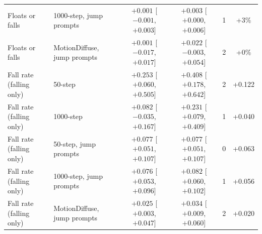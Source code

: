 \begin{tabular}{llcccc}
Floats or falls & 1000-step, jump prompts & $+0.001$ [$-0.001$, $+0.003$] & $+0.003$ [$+0.000$, $+0.006$] & 1 & +3\% \\
Floats or falls & MotionDiffuse, jump prompts & $+0.001$ [$-0.017$, $+0.017$] & $+0.022$ [$-0.003$, $+0.054$] & 2 & +0\% \\
\addlinespace[2pt]
Fall rate (falling only) & 50-step & $+0.253$ [$+0.060$, $+0.505$] & $+0.408$ [$+0.178$, $+0.642$] & 2 & +0.122 \\
Fall rate (falling only) & 1000-step & $+0.082$ [$-0.035$, $+0.167$] & $+0.231$ [$+0.079$, $+0.409$] & 1 & +0.040 \\
Fall rate (falling only) & 50-step, jump prompts & $+0.077$ [$+0.051$, $+0.107$] & $+0.077$ [$+0.051$, $+0.107$] & 0 & +0.063 \\
Fall rate (falling only) & 1000-step, jump prompts & $+0.076$ [$+0.053$, $+0.096$] & $+0.082$ [$+0.060$, $+0.102$] & 1 & +0.056 \\
Fall rate (falling only) & MotionDiffuse, jump prompts & $+0.025$ [$+0.003$, $+0.047$] & $+0.034$ [$+0.009$, $+0.060$] & 2 & +0.020 \\
\bottomrule
\end{tabular}
